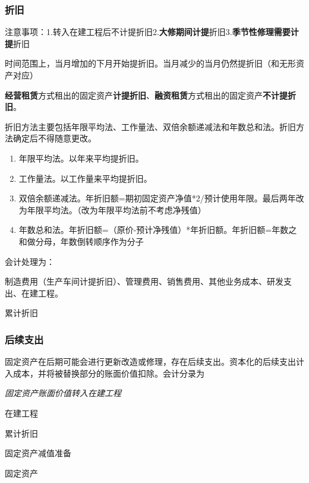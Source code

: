 \documentclass[UTF8,12pt]{ctexart}
\newenvironment{Dr}{%
	\begin{list}{}%
		{
			\setlength{\leftmargin}{2em}
			\setlength{\labelwidth}{2em}
			\setlength{\labelsep}{0pt}
			\setlength{\itemindent}{0pt}
			\setlength{\listparindent}{0pt}
			\setlength{\parsep}{0pt}
			\setlength{\topsep}{0pt}
		}
		\item[\textbf{借：}]
	}{%
	\end{list}
}
\newenvironment{Cr}{%
	\begin{list}{}%
		{
			\setlength{\leftmargin}{3em}
			\setlength{\labelwidth}{2em}
			\setlength{\labelsep}{0pt}
			\setlength{\itemindent}{0pt}
			\setlength{\listparindent}{0pt}
			\setlength{\parsep}{0pt}
			\setlength{\topsep}{0pt}
		}
		\item[\textbf{贷：}]
	}{%
	\end{list}
}
\numberwithin{equation}{section} %
\numberwithin{figure}{section}
\numberwithin{table}{section}
\begin{document}
	\subsubsection{折旧}
	注意事项：1.转入在建工程后不计提折旧2.\textbf{大修期间计提}折旧3.\textbf{季节性修理需要计提}折旧
	
	时间范围上，当月增加的下月开始提折旧。当月减少的当月仍然提折旧（和无形资产对应）
	
	\textbf{经营租赁}方式租出的固定资产\textbf{计提折旧}、\textbf{融资租赁}方式租出的固定资产\textbf{不计提折旧}。
	
	折旧方法主要包括年限平均法、工作量法、双倍余额递减法和年数总和法。折旧方法确定后不得随意更改。
	
	\begin{enumerate}
		\item 年限平均法。以年来平均提折旧。
		
		\item 工作量法。以工作量来平均提折旧。
		
		\item 双倍余额递减法。年折旧额=期初固定资产净值*2/预计使用年限。最后两年改为年限平均法。（改为年限平均法前不考虑净残值）
		
		\item 年数总和法。年折旧额=（原价-预计净残值）*年折旧额。年折旧额=年数之和做分母，年数倒转顺序作为分子
	\end{enumerate}
	
	会计处理为：
	
	\begin{Dr}
		制造费用（生产车间计提折旧）、管理费用、销售费用、其他业务成本、研发支出、在建工程。
	\end{Dr}
	\begin{Cr}
		累计折旧
	\end{Cr}
	
	\subsubsection{后续支出}
	
	固定资产在后期可能会进行更新改造或修理，存在后续支出。资本化的后续支出计入成本，并将被替换部分的账面价值扣除。会计分录为
	
	\textit{固定资产账面价值转入在建工程}
	
	\begin{Dr}
		在建工程
		
		累计折旧
		
		固定资产减值准备
	\end{Dr}
	\begin{Cr}
		固定资产
	\end{Cr}
	
\end{document}

